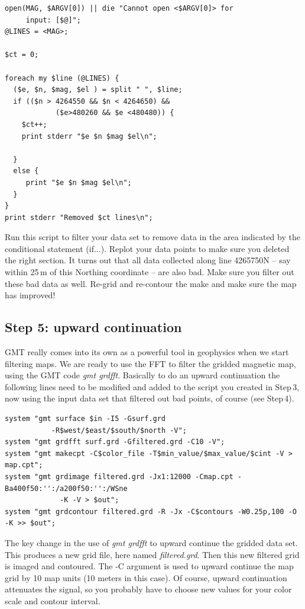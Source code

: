 \documentclass[letterpaper,10pt]{report}
\begin{document}
\begin{mdframed}[style=MyFrame]
\begin{verbatim}
open(MAG, $ARGV[0]) || die "Cannot open <$ARGV[0]> for
     input: [$@]";
@LINES = <MAG>;

$ct = 0;

foreach my $line (@LINES) {
  ($e, $n, $mag, $el ) = split " ", $line;
  if (($n > 4264550 && $n < 4264650) && 
            ($e>480260 && $e <480480)) {
  	$ct++;
  	print stderr "$e $n $mag $el\n";
     
  }
  else {
  	 print "$e $n $mag $el\n";
  }
}
print stderr "Removed $ct lines\n";
\end{verbatim}
\end{mdframed}
\vspace{3 mm}
Run this script to filter your data set to remove data in the area indicated by the conditional statement (if...). Replot your data points to make sure you deleted the right section. It turns out that all data collected along line 4265750N -- say within 25\,m of this Northing coordinate -- are also bad. Make sure you filter out these bad data as well. Re-grid and re-contour the make and make sure the map has improved! 

\subsection*{Step 5: upward continuation}
GMT really comes into its own as a powerful tool in geophysics when we start filtering maps. We are ready to use the FFT to filter the gridded magnetic map, using the GMT code {\it gmt grdfft}. Basically to do an upward continuation the following lines need to be modified and added to the script you created in Step\,3, now using the input data set that filtered out bad points, of course (see Step\,4). 
\begin{verbatim}
system "gmt surface $in -I5 -Gsurf.grd 
           -R$west/$east/$south/$north -V";
system "gmt grdfft surf.grd -Gfiltered.grd -C10 -V";
system "gmt makecpt -C$color_file -T$min_value/$max_value/$cint -V > map.cpt";
system "gmt grdimage filtered.grd -Jx1:12000 -Cmap.cpt -Ba400f50:'':/a200f50:'':/WSne 
             -K -V > $out";
system "gmt grdcontour filtered.grd -R -Jx -C$contours -W0.25p,100 -O -K >> $out";
\end{verbatim}
The key change in the use of {\it gmt grdfft} to upward continue the gridded data set. This produces a new grid file, here named {\it filtered.grd}. Then this new filtered grid is imaged and contoured. The -C argument is used to upward continue the map grid by 10 map units (10 meters in this case). Of course, upward continuation attenuates the signal, so you probably have to choose new values for your color scale and contour interval. 
\end{document}
